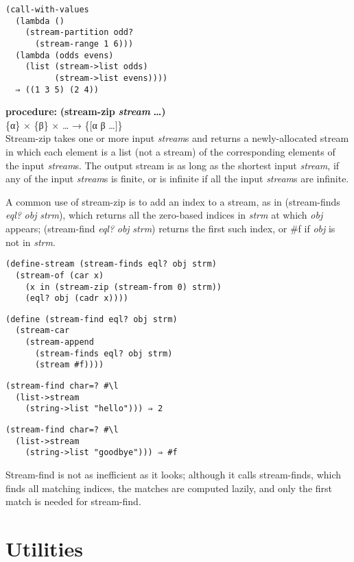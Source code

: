 \begin{verbatim}
(call-with-values
  (lambda ()
    (stream-partition odd?
      (stream-range 1 6)))
  (lambda (odds evens)
    (list (stream->list odds)
          (stream->list evens))))
  ⇒ ((1 3 5) (2 4))
\end{verbatim}

\textbf{procedure:} \textbf{(stream-zip} \textbf{\emph{stream}}
\textbf{\ldots{})}\\
\{α\} × \{β\} × \ldots{} → \{{[}α β \ldots{}{]}\}\\
Stream-zip takes one or more input \emph{stream}s and returns a
newly-allocated stream in which each element is a list (not a stream) of
the corresponding elements of the input \emph{stream}s. The output
stream is as long as the shortest input \emph{stream}, if any of the
input \emph{stream}s is finite, or is infinite if all the input
\emph{stream}s are infinite.

A common use of stream-zip is to add an index to a stream, as in
(stream-finds \emph{eql?} \emph{obj} \emph{strm}), which returns all the
zero-based indices in \emph{strm} at which \emph{obj} appears;
(stream-find \emph{eql?} \emph{obj} \emph{strm}) returns the first such
index, or \#f if \emph{obj} is not in \emph{strm}.

\begin{verbatim}
(define-stream (stream-finds eql? obj strm)
  (stream-of (car x)
    (x in (stream-zip (stream-from 0) strm))
    (eql? obj (cadr x))))
\end{verbatim}

\begin{verbatim}
(define (stream-find eql? obj strm)
  (stream-car
    (stream-append
      (stream-finds eql? obj strm)
      (stream #f))))
\end{verbatim}

\begin{verbatim}
(stream-find char=? #\l
  (list->stream
    (string->list "hello"))) ⇒ 2
\end{verbatim}

\begin{verbatim}
(stream-find char=? #\l
  (list->stream
    (string->list "goodbye"))) ⇒ #f
\end{verbatim}

Stream-find is not as inefficient as it looks; although it calls
stream-finds, which finds all matching indices, the matches are computed
lazily, and only the first match is needed for stream-find.

\section{Utilities}\label{utilities}

